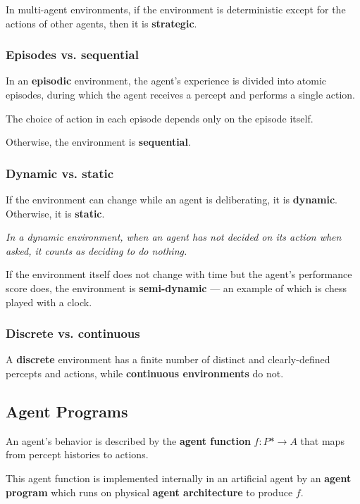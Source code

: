 In multi-agent environments, if the environment is deterministic except for the actions of other agents, then it is \textbf{strategic}.


\subsubsection{Episodes vs. sequential}

In an \textbf{episodic} environment, the agent's experience is divided into atomic episodes, during which the agent receives a percept and performs a single action.

The choice of action in each episode depends only on the episode itself.

Otherwise, the environment is \textbf{sequential}.


\subsubsection{Dynamic vs. static}

If the environment can change while an agent is deliberating, it is \textbf{dynamic}. Otherwise, it is \textbf{static}.

\emph{In a dynamic environment, when an agent has not decided on its action when asked, it counts as deciding to do nothing.}

If the environment itself does not change with time but the agent's performance score does, the environment is \textbf{semi-dynamic} — an example of which is chess played with a clock.


\subsubsection{Discrete vs. continuous}

A \textbf{discrete} environment has a finite number of distinct and clearly-defined percepts and actions, while \textbf{continuous environments} do not.


\subsection{Agent Programs}

An agent's behavior is described by the \textbf{agent function} $f: P* \rightarrow A$ that maps from percept histories to actions.

This agent function is implemented internally in an artificial agent by an \textbf{agent program} which runs on physical \textbf{agent architecture} to produce $f$.

